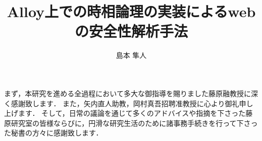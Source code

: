 \documentclass[12pt,a4paper]{jbook}
\title{Alloy上での時相論理の実装によるwebの安全性解析手法}
\author{島本 隼人}
\begin{document}
\coverpage
\tableofcontents
\listoffigures
\listoftables
\body









\acknowledgement
まず，本研究を進める全過程において多大な御指導を賜りました藤原融教授に深く感謝致します．
また，矢内直人助教，岡村真吾招聘准教授に心より御礼申し上げます．
そして，日常の議論を通じて多くのアドバイスや指摘を下さった藤原研究室の皆様ならびに，円滑な研究生活のために諸事務手続きを行って下さった秘書の方々に感謝致します．


 
\end{document}
